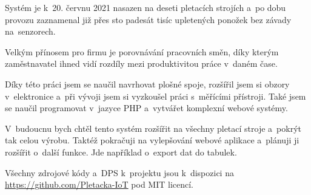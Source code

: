 \documentclass[12pt, a4paper]{article}
\begin{document}
Systém je k 20. červnu 2021 nasazen na deseti pletacích strojích a po dobu provozu zaznamenal již přes sto padesát tisíc upletených ponožek bez závady na~senzorech.

Velkým přínosem pro firmu je porovnávání pracovních směn, díky kterým zaměstnavatel ihned vidí rozdíly mezi produktivitou práce v~daném čase.

Díky této práci jsem se naučil navrhovat plošné spoje, rozšířil jsem si obzory v~elektronice a~při vývoji jsem si vyzkoušel práci s~měřícími přístroji. 
Také jsem se naučil programovat v~jazyce PHP a~vytvářet komplexní webové systémy.

V~budoucnu bych chtěl tento systém rozšířit na všechny pletací stroje a~pokrýt tak celou výrobu.
Taktéž pokračuji na vylepšování webové aplikace a~plánuji ji rozšířit o~další funkce.
Jde například o~export dat do tabulek.

Všechny zdrojové kódy a~DPS k~projektu jsou k~dispozici na \url{https://github.com/Pletacka-IoT} pod MIT licencí.

\newpage


\printbibliography[title=Literatura]



\appendix



\end{document}

